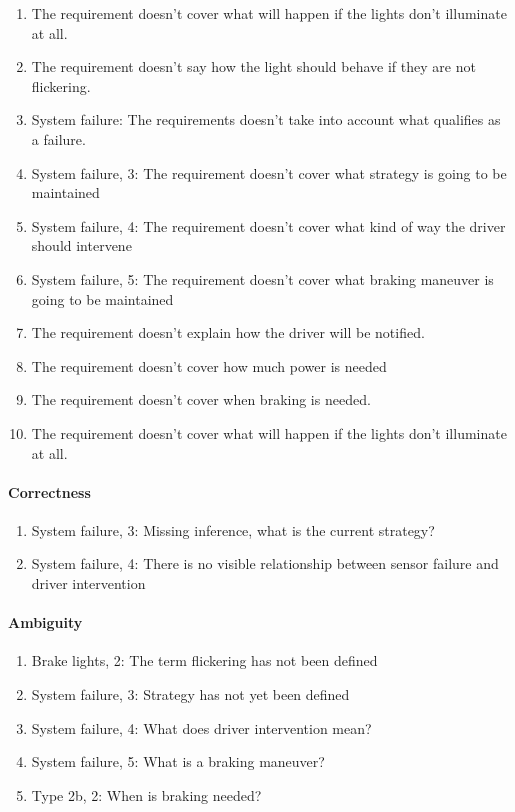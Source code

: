 \begin{enumerate}
    \item{The requirement doesn't cover what will happen if the lights don't illuminate at all.}
    \item{The requirement doesn't say how the light should behave if they are not flickering.}
    
    \item{System failure: The requirements doesn't take into account what qualifies as a failure.}
    \item{System failure, 3: The requirement doesn't cover what strategy is going to be maintained}
    \item{System failure, 4: The requirement doesn't cover what kind of way the driver should intervene}
    \item{System failure, 5: The requirement doesn't cover what braking maneuver is going to be maintained}
    
    \item{The requirement doesn't explain how the driver will be notified.}
    \item{The requirement doesn't cover how much power is needed}
    \item{The requirement doesn't cover when braking is needed.}
    \item{The requirement doesn't cover what will happen if the lights don't illuminate at all.}
\end{enumerate}

\paragraph{Correctness}

\begin{enumerate}
    \item{System failure, 3: Missing inference, what is the current strategy?}
    \item{System failure, 4: There is no visible relationship between sensor failure and driver intervention}
\end{enumerate}

\paragraph{Ambiguity}

\begin{enumerate}
    \item{Brake lights, 2: The term flickering has not been defined}
    \item{System failure, 3: Strategy has not yet been defined}
    \item{System failure, 4: What does driver intervention mean?}
    \item{System failure, 5: What is a braking maneuver?}
    \item{Type 2b, 2: When is braking needed?}
\end{enumerate}
